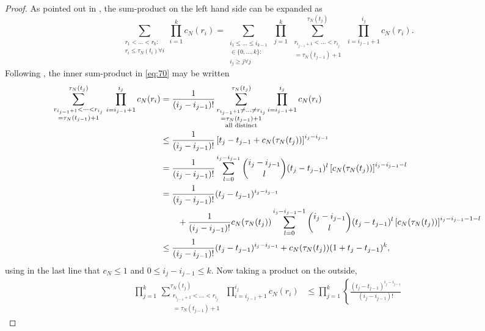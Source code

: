 \documentclass{article}
\newcommand{\1}[1]{\mathbbm{1}_{#1}}
\begin{document}
\begin{proof}
As pointed out in \citet[p.~460]{mohle1999}, the sum-product on the left hand side can be expanded as
\begin{equation}\label{eq:70}
\sum_{\substack{r_1<\dots<r_k :\\ r_i\leq \tau_N(t_i) \forall i}} \prod_{i=1}^k c_N(r_i)
= \sum_{\substack{i_1\leq \dots\leq i_{k-1}\\ \in \{0,\dots,k\} :\\ i_j \geq j \forall j}} \, \prod_{j=1}^k \,
\sum_{\substack{ r_{i_{j-1}+1} < \dots < r_{i_j} \\ = \tau_N(t_{j-1})+1}}^{\tau_N(t_j)}  \,\prod_{i=i_{j-1}+1}^{i_j} c_N(r_i) .
\end{equation}
Following \citet[(8)--(9)]{koskela2018}, the inner sum-product in \eqref{eq:70} may be written
\begin{align}
\sum_{\substack{ r_{i_{j-1}+1} < \dots < r_{i_j} \\ = \tau_N(t_{j-1})+1}}^{\tau_N(t_j)}  \,\prod_{i=i_{j-1}+1}^{i_j} c_N(r_i)
&= \frac{1}{(i_j - i_{j-1})!} \sum_{\substack{ r_{i_{j-1}+1} \neq \dots \neq r_{i_j} \\ = \tau_N(t_{j-1})+1 \\ \text{all distinct}}}^{\tau_N(t_j)}
\prod_{i=i_{j-1}+1}^{i_j} c_N(r_i) \notag\\
&\leq \frac{1}{(i_j - i_{j-1})!} \left[ t_j - t_{j-1} + c_N(\tau_N(t_j)) \right]^{i_j - i_{j-1}} \notag\\
&= \frac{1}{(i_j - i_{j-1})!} \sum_{l=0}^{i_j - i_{j-1}} \binom{i_j - i_{j-1}}{l} (t_j - t_{j-1})^l \left[ c_N(\tau_N(t_j)) \right]^{i_j - i_{j-1}-l} \notag\\
&= \frac{1}{(i_j - i_{j-1})!} (t_j - t_{j-1})^{i_j - i_{j-1}} \notag\\
&\qquad+ \frac{1}{(i_j - i_{j-1})!} c_N(\tau_N(t_j)) \sum_{l=0}^{i_j - i_{j-1} -1} \binom{i_j - i_{j-1}}{l} (t_j - t_{j-1})^l \left[ c_N(\tau_N(t_j)) \right]^{i_j - i_{j-1}-1-l} \notag\\
&\leq \frac{1}{(i_j - i_{j-1})!} (t_j - t_{j-1})^{i_j - i_{j-1}} 
+ c_N(\tau_N(t_j)) (1+ t_j - t_{j-1})^k ,
\end{align}
using in the last line that $c_N \leq 1$ and $0 \leq i_j - i_{j-1} \leq k$.
Now taking a product on the outside,
\begin{align}
\prod_{j=1}^k \,
\sum_{\substack{ r_{i_{j-1}+1} < \dots < r_{i_j} \\ = \tau_N(t_{j-1})+1}}^{\tau_N(t_j)}  \,\prod_{i=i_{j-1}+1}^{i_j} c_N(r_i)
&\leq \prod_{j=1}^k \left\{ \frac{(t_j - t_{j-1})^{i_j - i_{j-1}}}{(i_j - i_{j-1})!}  

\end{align}
\end{proof}
\end{document}
